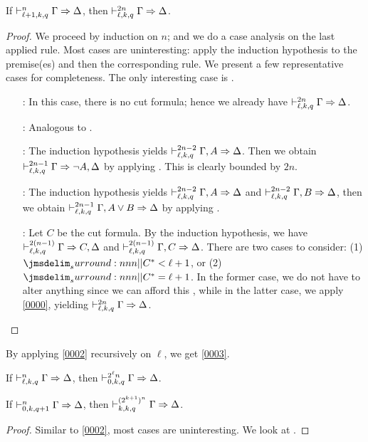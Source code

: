 \documentclass[a4paper]{article}
\begin{document}
\begin{lemma}\label{0002}
  If $\mathrel{\vdash^{n}_{\ell + 1,k,q}} \Gamma \Rightarrow \Delta$, then $\mathrel{\vdash^{2n}_{\ell,k,q}} \Gamma \Rightarrow \Delta$.
\end{lemma}
\begin{proof}
  We proceed by induction on $n$; and we do a case analysis on the last applied rule.
  Most cases are uninteresting: apply the induction hypothesis to the premise(es) and then the corresponding rule.
  We present a few representative cases for completeness.
  The only interesting case is \rCut.
  \begin{itemize}
  \item[\rId:] In this case, there is no cut formula; hence we already have $\mathrel{\vdash^{2n}_{\ell,k,q}} \Gamma \Rightarrow \Delta$.
  \item[\rLBot:] Analogous to \rId.
  \item[\rRNot:] The induction hypothesis yields $\mathrel{\vdash^{2n - 2}_{\ell,k,q}} \Gamma, A \Rightarrow \Delta$.
    Then we obtain $\mathrel{\vdash^{2n - 1}_{\ell,k,q}} \Gamma \Rightarrow \lnot A, \Delta$ by applying \rRNot.
    This is clearly bounded by $2n$.
  \item[\rLDis:] The induction hypothesis yields $\mathrel{\vdash^{2n - 2}_{\ell,k,q}} \Gamma, A \Rightarrow \Delta$ and $\mathrel{\vdash^{2n - 2}_{\ell,k,q}} \Gamma, B \Rightarrow \Delta$, then we obtain $\mathrel{\vdash^{2n - 1}_{\ell,k,q}} \Gamma, A \vee B \Rightarrow \Delta$ by applying \rLDis.
  \item[\rCut:] Let $C$ be the cut formula.
    By the induction hypothesis, we have $\mathrel{\vdash^{2(n-1)}_{\ell,k,q}} \Gamma \Rightarrow C,\Delta$ and $\mathrel{\vdash^{2(n-1)}_{\ell,k,q}} \Gamma,C \Rightarrow \Delta$.
    There are two cases to consider: (1) $\dRank{C} < \ell + 1$, or (2) $\dRank{C} = \ell + 1$.
    In the former case, we do not have to alter anything since we can afford this \rCut, while in the latter case, we apply \cref{0000}, yielding $\mathrel{\vdash^{2n}_{\ell,k,q}} \Gamma \Rightarrow \Delta$.
  \end{itemize}
\end{proof}

By applying \cref{0002} recursively on $\ell$, we get \cref{0003}.

\begin{corollary}\label{0003}
  If $\mathrel{\vdash^{n}_{\ell,k,q}} \Gamma \Rightarrow \Delta$, then $\mathrel{\vdash^{2^{\ell}n}_{0,k,q}} \Gamma \Rightarrow \Delta$.
\end{corollary}

\begin{lemma}\label{0005}
  If $\mathrel{\vdash^{n}_{0,k,q+1}} \Gamma \Rightarrow \Delta$, then $\mathrel{\vdash^{(2^{k+1})^n}_{k,k,q}} \Gamma \Rightarrow \Delta$.
\end{lemma}
\begin{proof}
  Similar to \cref{0002}, most cases are uninteresting.
  We look at \rCut.
\end{proof}

% 
% 
\end{document}
